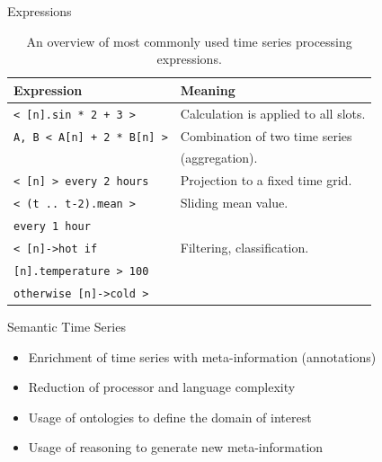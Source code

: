 \documentclass{beamer}
\begin{document}
\begin{frame}{Expressions}
\begin{table}                                                             
\centering                                                                
\begin{tabular}{|l|l|}                                                    
\hline                                                                    
\textbf{Expression} & \textbf{Meaning} \\                                 
\hline                                                                    
\texttt{< [n].sin * 2 + 3 >} & Calculation is applied to all slots. \\    
\hline                                                                    
\texttt{A, B < A[n] + 2 * B[n] >} & Combination of two time series \\     
& (aggregation). \\                                                       
\hline                                                                    
\texttt{< [n] > every 2 hours} & Projection to a fixed time grid. \\      
\hline                                                                    
\texttt{< (t .. t-2).mean >} & Sliding mean value. \\                     
\texttt{every 1 hour} & \\                                                
\hline                                                                    
\texttt{< [n]->hot if} & Filtering, classification. \\                    
\texttt{[n].temperature > 100} & \\                                       
\texttt{otherwise [n]->cold >} & \\                                       
\hline                                                                    
\end{tabular}  
\caption{An overview of most commonly used time series processing expressions.}
\end{table}
\end{frame}

\begin{frame}{Semantic Time Series}
\begin{itemize}
\item Enrichment of time series with meta-information (annotations)
\item Reduction of processor and language complexity
\item Usage of ontologies to define the domain of interest
\item Usage of reasoning to generate new meta-information
\end{itemize}
\end{frame}
\end{document}
